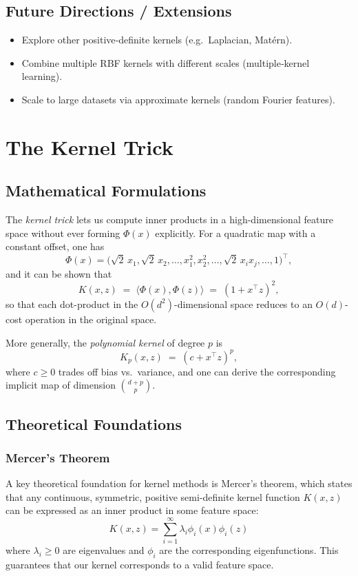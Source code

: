 \documentclass[11pt]{article}
\begin{document}
\subsection{Future Directions / Extensions}
\begin{itemize}
  \item Explore other positive‐definite kernels (e.g.\ Laplacian, Matérn).  
  \item Combine multiple RBF kernels with different scales (multiple‐kernel learning).  
  \item Scale to large datasets via approximate kernels (random Fourier features).
\end{itemize}
\section{The Kernel Trick}

\subsection{Mathematical Formulations}
The \emph{kernel trick} lets us compute inner products in a high-dimensional feature space without ever forming $\Phi(x)$ explicitly. For a quadratic map with a constant offset, one has
\[
\Phi(x) = \bigl(\sqrt{2}\,x_1,\sqrt{2}\,x_2,\dots,x_1^2,x_2^2,\dots,\sqrt{2}\,x_i x_j,\dots,1\bigr)^\top,
\]
and it can be shown that
\[
K(x,z) \;=\;\langle \Phi(x),\Phi(z)\rangle \;=\;(1 + x^\top z)^2,
\]
so that each dot-product in the $O(d^2)$-dimensional space reduces to an $O(d)$-cost operation in the original space.

More generally, the \emph{polynomial kernel} of degree $p$ is
\[
K_p(x,z) \;=\;(c + x^\top z)^p,
\]
where $c\ge0$ trades off bias vs.\ variance, and one can derive the corresponding implicit map of dimension $\binom{d+p}{p}$.

\subsection{Theoretical Foundations}
\subsubsection{Mercer's Theorem}
A key theoretical foundation for kernel methods is Mercer's theorem, which states that any continuous, symmetric, positive semi-definite kernel function $K(x,z)$ can be expressed as an inner product in some feature space:
\[
K(x,z) = \sum_{i=1}^{\infty} \lambda_i \phi_i(x) \phi_i(z)
\]
where $\lambda_i \geq 0$ are eigenvalues and $\phi_i$ are the corresponding eigenfunctions. This guarantees that our kernel corresponds to a valid feature space.
\end{document}
